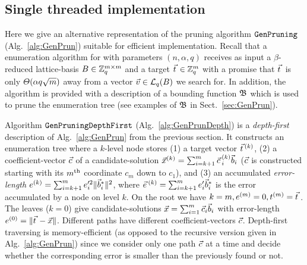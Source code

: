 \subsection{Single threaded implementation} \label{sec:SingleThread}

Here we give an alternative representation of the pruning algorithm $\texttt{GenPruning}$ (Alg.~\ref{alg:GenPrun}) suitable for efficient implementation.
Recall that a \BDD enumeration algorithm for \LWE with parameters $(n, \alpha, q)$ receives as input a $\beta$-reduced lattice-basis $B \in {{\mathbb Z}}_q^{m \times m}$ and a target $\tvec \in \Z_q^m$ with a promise that $\tvec$ is only $\varTheta(\alpha q \sqrt{m})$ away from a vector $\vvec \in \qLat(\BMat)$ we search for. In addition, the algorithm is provided with a description of a bounding function $\mathfrak{B}$ which is used to prune the enumeration tree (see examples of $\mathfrak{B}$ in Sect.~\ref{sec:GenPrun}).

Algorithm $\texttt{GenPruningDepthFirst}$ (Alg.~\ref{alg:GenPrunDepth}) is a \emph{depth-first} description of Alg.~\ref{alg:GenPrun} from the previous section. It constructs an enumeration tree where a $k$-level node stores (1) a target vector $\tvec^{(k)}$, (2) a coefficient-vector $\cvec$ of a candidate-solution $\xvec^{(k)} = \sum_{i=k+1}^m \cvec^{(k)}_i \bvec_i$ ($\cvec$ is constructed starting with its $m^{\mathrm{th}}$ coordinate $c_m$ down to $c_1$), and (3) an accumulated \emph{error-length} $e^{(k)} = \sum_{i=k+1}^{m} e'^2_i \|\vec b^*_i \|^2$, where $\evec^{(k)} = \sum_{i=k+1}^{m} e'_i \wbvec_i$ is the error accumulated by a node on level $k$. On the root we have $k=m, e^{(m)}=0, t^{(m)} = \tvec$. The leaves ($k=0$) give candidate-solutions $\xvec = \sum_{i=1}^{m} \cvec_i \bvec_i $ with error-length $e^{(0)} =\| \tvec - \xvec \|$. Different paths have different coefficient-vectors $\cvec$. Depth-first traversing is memory-efficient (as opposed to the recursive version given in Alg.~\ref{alg:GenPrun}) since we consider only one path $\cvec$ at a time and decide whether the corresponding error is smaller than the previously found or not. 

